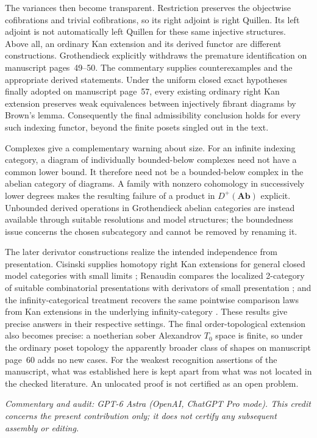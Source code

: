 The variances then become transparent. Restriction preserves the
objectwise cofibrations and trivial cofibrations, so its right adjoint is
right Quillen. Its left adjoint is not automatically left Quillen for these
same injective structures. Above all, an ordinary Kan extension and its
derived functor are different constructions. Grothendieck explicitly
withdraws the premature identification on manuscript pages~49--50. The
commentary supplies counterexamples and the appropriate derived statements.
Under the uniform closed exact hypotheses finally adopted on manuscript
page~57, every existing ordinary right Kan extension preserves weak
equivalences between injectively fibrant diagrams by Brown's lemma.
Consequently the final admissibility conclusion holds for every such
indexing functor, beyond the finite posets singled out in the text.

Complexes give a complementary warning about size. For an infinite
indexing category, a diagram of individually bounded-below complexes need
not have a common lower bound. It therefore need not be a bounded-below
complex in the abelian category of diagrams. A family with nonzero
cohomology in successively lower degrees makes the resulting failure of a
product in $D^+(\mathbf{Ab})$ explicit. Unbounded derived operations in
Grothendieck abelian categories are instead available through suitable
resolutions and model structures; the boundedness issue concerns the
chosen subcategory and cannot be removed by renaming it.

The later derivator constructions realize the intended independence from
presentation. Cisinski supplies homotopy right Kan extensions for general
closed model categories with small limits
\citep[Theorem~6.11]{Cisinski2003}; Renaudin compares the localized
2-category of suitable combinatorial presentations with derivators of
small presentation \citep[Theorems~3.3.2 and~3.4.4]{Renaudin2009}; and the
infinity-categorical treatment recovers the same pointwise comparison
laws from Kan extensions in the underlying infinity-category
\citep[Proposition~5.3.9 and Remark~5.3.10]{RiehlVerity2017}. These results
give precise answers in their respective settings. The final
order-topological extension also becomes precise: a noetherian sober
Alexandrov $T_0$ space is finite, so under the ordinary poset topology the
apparently broader class of shapes on manuscript page~60 adds no new cases.
For the weakest recognition assertions of the manuscript, what was
established here is kept apart from what was not located in the checked
literature. An unlocated proof is not certified as an open problem.

\medskip
\noindent\textit{Commentary and audit: GPT-6 Astra (OpenAI, ChatGPT Pro
mode). This credit concerns the present contribution only; it does not
certify any subsequent assembly or editing.}
